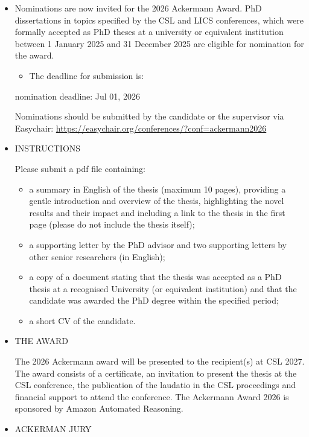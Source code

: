 \documentclass[prodmode,acmtecs]{acmsmall} %
\begin{document}
\begin{itemize}\item  Nominations are now invited for the 2026 Ackermann Award. PhD dissertations in topics specified by the CSL and LICS conferences, which were formally accepted as PhD theses at a university or equivalent institution between 1 January 2025 and 31 December 2025 are eligible for nomination for the award. 
 
\begin{itemize}\item  The deadline for submission is: 
\end{itemize} 
nomination deadline: Jul 01, 2026 
 
  Nominations should be submitted by the candidate or the supervisor via Easychair: \href{https://easychair.org/conferences/?conf=ackermann2026}{https://easychair.org/conferences/?conf=ackermann2026} 
 
\item  INSTRUCTIONS 
 
  Please submit a pdf file containing: 
 
\begin{itemize}\item  a summary in English of the thesis (maximum 10 pages), providing a gentle introduction and overview of the thesis, highlighting the novel results and their impact and including a link to the thesis in the first page (please do not include the thesis itself);
\item  a supporting letter by the PhD advisor and two supporting letters by other senior researchers (in English);
\item  a copy of a document stating that the thesis was accepted as a PhD thesis at a recognised University (or equivalent institution) and that the candidate was awarded the PhD degree within the specified period;
\item  a short CV of the candidate.
\end{itemize} 
\item  THE AWARD 
 
  The 2026 Ackermann award will be presented to the recipient(s) at CSL 2027. The award consists of a certificate, an invitation to present the thesis at the CSL conference, the publication of the laudatio in the CSL proceedings and financial support to attend the conference. The Ackermann Award 2026 is sponsored by Amazon Automated Reasoning. 
 
\item  ACKERMAN JURY  
 

\end{itemize}
\end{document}
